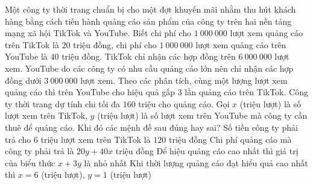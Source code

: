 \begin{ex}%
	Một công ty thời trang chuẩn bị cho một đợt khuyến mãi nhằm thu hút khách hàng bằng cách tiến hành quảng cáo sản phẩm của công ty trên hai nền tảng mạng xã hội TikTok và YouTube. Biết chi phí cho $1~000~000$ lượt xem quảng cáo trên TikTok là $20$ triệu đồng, chi phí cho $1~000~000$ lượt xem quảng cáo trên YouTube là $40$ triệu đồng. TikTok chỉ nhận các hợp đồng trên $6~000~000$ lượt xem. YouTube do các công ty có nhu cầu quảng cáo lớn nên chỉ nhận các hợp đồng dưới $3~000~000$ lượt xem. Theo các phân tích, cùng một lượng lượt xem quảng cáo thì trên YouTube cho hiệu quả gấp $3$ lần quảng cáo trên TikTok. Công ty thời trang dự tính chi tối đa $160$ triệu cho quảng cáo. Gọi $x$ (triệu lượt) là số lượt xem trên TikTok, $y$ (triệu lượt) là số lượt xem trên YouTube mà công ty cần thuê để quảng cáo. Khi đó các mệnh đề sau đúng hay sai?
	\choiceTF
	{\True Số tiền công ty phải trả cho $6$ triệu lượt xem trên TikTok là $120$ triệu đồng}
	{Chi phí quảng cáo mà công ty phải trả là $20y+40x$ triệu đồng} 
	{Để hiệu quảng cáo cao nhất thì giá trị của biểu thức $x+3y$ là nhỏ nhất} 
	{\True Khi thời lượng quảng cáo đạt hiểu quả cao nhất thì $x=6$ (triệu lượt), $y=1$ (triệu lượt)} 
\end{ex}
